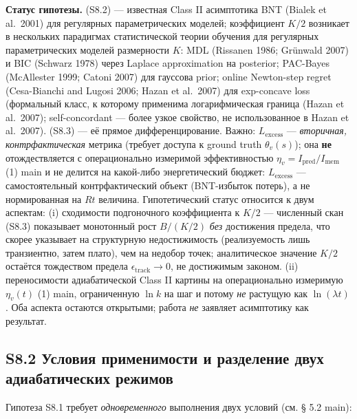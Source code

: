 \documentclass[pdflatex,sn-mathphys-ay]{sn-jnl}
\begin{document}
\textbf{Статус гипотезы.} (S8.2) --- известная Class II асимптотика BNT (Bialek et al.~2001) для регулярных параметрических моделей; коэффициент \(K/2\) возникает в нескольких парадигмах статистической теории обучения для регулярных параметрических моделей размерности \(K\): MDL (Rissanen 1986; Grünwald 2007) и BIC (Schwarz 1978) через Laplace approximation на posterior; PAC-Bayes (McAllester 1999; Catoni 2007) для гауссова prior; online Newton-step regret (Cesa-Bianchi and Lugosi 2006; Hazan et al.~2007) для exp-concave loss (формальный класс, к которому применима логарифмическая граница (Hazan et al.~2007); self-concordant --- более узкое свойство, не использованное в Hazan et al.~2007). (S8.3) --- её прямое дифференцирование. Важно: \(L_{\text{excess}}\) --- \emph{вторичная, контрфактическая} метрика (требует доступа к ground truth \(\theta_v(s)\)); она \textbf{не} отождествляется с операционально измеримой эффективностью \(\eta_v = I_{\text{pred}}/I_{\text{mem}}\) (1) main и не делится на какой-либо энергетический бюджет: \(L_{\text{excess}}\) --- самостоятельный контрфактический объект (BNT-избыток потерь), а не нормированная на \(Rt\) величина. Гипотетический статус относится к двум аспектам: (i) сходимости подгоночного коэффициента к \(K/2\) --- численный скан (S8.3) показывает монотонный рост \(B/(K/2)\) \emph{без} достижения предела, что скорее указывает на структурную недостижимость (реализуемость лишь транзиентно, затем плато), чем на недобор точек; аналитическое значение \(K/2\) остаётся тождеством предела \(\epsilon_{\text{track}} \to 0\), не достижимым законом. (ii) переносимости адиабатической Class II картины на операционально измеримую \(\eta_v(t)\) (1) main, ограниченную \(\ln k\) на шаг и потому \emph{не} растущую как \(\ln(\lambda t)\). Оба аспекта остаются открытыми; работа \emph{не} заявляет асимптотику как результат.



\subsection*{S8.2 Условия применимости и разделение двух адиабатических режимов}\label{s8.2-ux443ux441ux43bux43eux432ux438ux44f-ux43fux440ux438ux43cux435ux43dux438ux43cux43eux441ux442ux438-ux438-ux440ux430ux437ux434ux435ux43bux435ux43dux438ux435-ux434ux432ux443ux445-ux430ux434ux438ux430ux431ux430ux442ux438ux447ux435ux441ux43aux438ux445-ux440ux435ux436ux438ux43cux43eux432}



Гипотеза S8.1 требует \emph{одновременного} выполнения двух условий (см. § 5.2 main):
\end{document}
